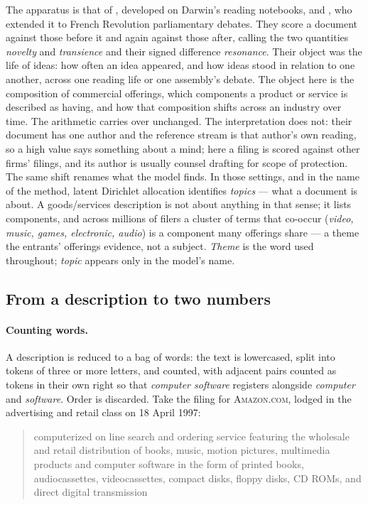 The apparatus is that of \citet{Murdock2017}, developed on Darwin's reading
notebooks, and \citet{Barron2018}, who extended it to French Revolution
parliamentary debates. They score a document against those before it and
again against those after, calling the two quantities \emph{novelty} and
\emph{transience} and their signed difference \emph{resonance}. Their object
was the life of ideas: how often an idea appeared, and how ideas stood in
relation to one another, across one reading life or one assembly's debate.
The object here is the composition of commercial offerings, which components
a product or service is described as having, and how that composition shifts
across an industry over time. The arithmetic carries over unchanged. The
interpretation does not: their document has one author and the reference
stream is that author's own reading, so a high value says something about a
mind; here a filing is scored against other firms' filings, and its author is
usually counsel drafting for scope of protection. The same shift renames
what the model finds. In those settings, and in the name of the method,
latent Dirichlet allocation identifies \emph{topics} --- what a document
is about. A goods/services description is not about anything in that
sense; it lists components, and across millions of filers a cluster of
terms that co-occur (\emph{video, music, games, electronic, audio}) is a
component many offerings share --- a theme the entrants' offerings
evidence, not a subject. \emph{Theme} is the word used throughout;
\emph{topic} appears only in the model's name.

\subsection{From a description to two numbers}\label{sec:definitions}

\paragraph{Counting words.} A description is reduced to a bag of words: the
text is lowercased, split into tokens of three or more letters, and counted,
with adjacent pairs counted as tokens in their own right so that
\emph{computer software} registers alongside \emph{computer} and
\emph{software}. Order is discarded. Take the filing for \textsc{Amazon.com},
lodged in the advertising and retail class on 18 April 1997:

\begin{quote}\small
computerized on line search and ordering service featuring the wholesale and
retail distribution of books, music, motion pictures, multimedia products and
computer software in the form of printed books, audiocassettes,
videocassettes, compact disks, floppy disks, CD ROMs, and direct digital
transmission
\end{quote}

